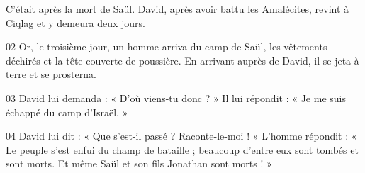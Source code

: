 C’était après la mort de Saül. David, après avoir battu les Amalécites, revint à Ciqlag et y demeura deux jours.

02 Or, le troisième jour, un homme arriva du camp de Saül, les vêtements déchirés et la tête couverte de poussière. En arrivant auprès de David, il se jeta à terre et se prosterna.

03 David lui demanda : « D’où viens-tu donc ? » Il lui répondit : « Je me suis échappé du camp d’Israël. »

04 David lui dit : « Que s’est-il passé ? Raconte-le-moi ! » L’homme répondit : « Le peuple s’est enfui du champ de bataille ; beaucoup d’entre eux sont tombés et sont morts. Et même Saül et son fils Jonathan sont morts ! »

